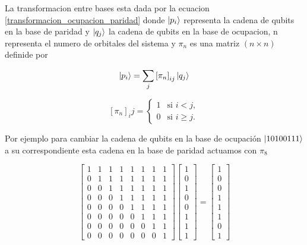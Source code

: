 \documentclass[12pt, oneside]{article}
\begin{document}
La transformacion entre bases esta dada por la ecuacion \ref{transformacion_ocupacion_paridad} donde $\ket{p_i}$ representa la cadena de qubits en la base de paridad y $\ket{q_j}$ la cadena de qubits en la base de ocupacion, n representa el numero de orbitales del sistema y $\pi_n$ es una matriz $\left(n\times n\right)$ definide por

\begin{equation}\label{transformacion_ocupacion_paridad}
    \ket{p_i}=\sum_j\left[\pi_{n}\right]_{ij}\ket{q_j}
\end{equation}

\begin{equation}\label{definicion_matriz_pi}
    \left[\pi_n\right]_ij=\begin{cases}
1 & \text{si } i < j, \\
0 & \text{si } i \geq j.
\end{cases}
\end{equation}

Por ejemplo para cambiar la cadena de qubits en la base de ocupación $\ket{10100111}$ a su correspondiente esta cadena en la base de paridad actuamos con $\pi_8$

\begin{equation}
    \begin{bmatrix}
        1&1&1&1&1&1&1&1\\
        0&1&1&1&1&1&1&1\\
        0&0&1&1&1&1&1&1\\
        0&0&0&1&1&1&1&1\\
        0&0&0&0&1&1&1&1\\
        0&0&0&0&0&1&1&1\\
        0&0&0&0&0&0&1&1\\
        0&0&0&0&0&0&0&1
    \end{bmatrix}\begin{bmatrix}
        1\\0\\1\\0\\0\\1\\1\\1
    \end{bmatrix}=\begin{bmatrix}
        1\\0\\0\\1\\1\\1\\0\\1
    \end{bmatrix}
\end{equation}
\end{document}
